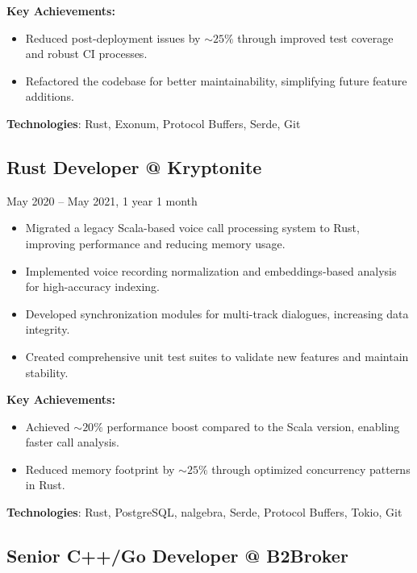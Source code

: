 \documentclass[a4paper,12pt]{article}
\begin{document}
\textbf{Key Achievements:}
\begin{itemize}[leftmargin=15pt]
    \item Reduced post-deployment issues by \(\sim 25\%\) through improved test coverage and robust CI processes.
    \item Refactored the codebase for better maintainability, simplifying future feature additions.
\end{itemize}

\textbf{Technologies}: Rust, Exonum, Protocol Buffers, Serde, Git

\vspace{3mm}

\subsection*{Rust Developer @ Kryptonite}

\quad May 2020 – May 2021, 1 year 1 month

\begin{itemize}[leftmargin=15pt]
    \item Migrated a legacy Scala-based voice call processing system to Rust, improving performance and reducing memory usage.
    \item Implemented voice recording normalization and embeddings-based analysis for high-accuracy indexing.
    \item Developed synchronization modules for multi-track dialogues, increasing data integrity.
    \item Created comprehensive unit test suites to validate new features and maintain stability.
\end{itemize}

\textbf{Key Achievements:}
\begin{itemize}[leftmargin=15pt]
    \item Achieved \(\sim 20\%\) performance boost compared to the Scala version, enabling faster call analysis.
    \item Reduced memory footprint by \(\sim 25\%\) through optimized concurrency patterns in Rust.
\end{itemize}

\textbf{Technologies}: Rust, PostgreSQL, nalgebra, Serde, Protocol Buffers, Tokio, Git

\vspace{3mm}

\subsection*{Senior C++/Go Developer @ B2Broker} 
\end{document}
